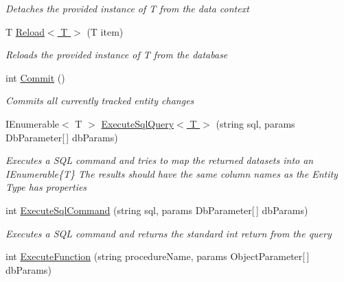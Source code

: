 \begin{DoxyCompactItemize}
\begin{DoxyCompactList}\small\item\em Detaches the provided instance of {\itshape T}  from the data context \end{DoxyCompactList}\item 
T \hyperlink{interface_highway_1_1_data_1_1_interfaces_1_1_i_data_context_ac56bd7fbcb297fd6d0deb0edafe057df}{Reload$<$ T $>$} (T item)
\begin{DoxyCompactList}\small\item\em Reloads the provided instance of {\itshape T}  from the database \end{DoxyCompactList}\item 
int \hyperlink{interface_highway_1_1_data_1_1_interfaces_1_1_i_data_context_a11952cf19e2562bcd82edd9c239c1aac}{Commit} ()
\begin{DoxyCompactList}\small\item\em Commits all currently tracked entity changes \end{DoxyCompactList}\item 
I\-Enumerable$<$ T $>$ \hyperlink{interface_highway_1_1_data_1_1_interfaces_1_1_i_data_context_a975fee919078b8770313b4b8582554e5}{Execute\-Sql\-Query$<$ T $>$} (string sql, params Db\-Parameter\mbox{[}$\,$\mbox{]} db\-Params)
\begin{DoxyCompactList}\small\item\em Executes a S\-Q\-L command and tries to map the returned datasets into an I\-Enumerable\{\-T\} The results should have the same column names as the Entity Type has properties \end{DoxyCompactList}\item 
int \hyperlink{interface_highway_1_1_data_1_1_interfaces_1_1_i_data_context_ad8d3d00bdfca146ea8197e050a215be3}{Execute\-Sql\-Command} (string sql, params Db\-Parameter\mbox{[}$\,$\mbox{]} db\-Params)
\begin{DoxyCompactList}\small\item\em Executes a S\-Q\-L command and returns the standard int return from the query \end{DoxyCompactList}\item 
int \hyperlink{interface_highway_1_1_data_1_1_interfaces_1_1_i_data_context_a27f9736cd139560b0b5debe9a7bc795a}{Execute\-Function} (string procedure\-Name, params Object\-Parameter\mbox{[}$\,$\mbox{]} db\-Params)
\begin{DoxyCompactList}\small\item\em \end{DoxyCompactList}\end{DoxyCompactItemize}
